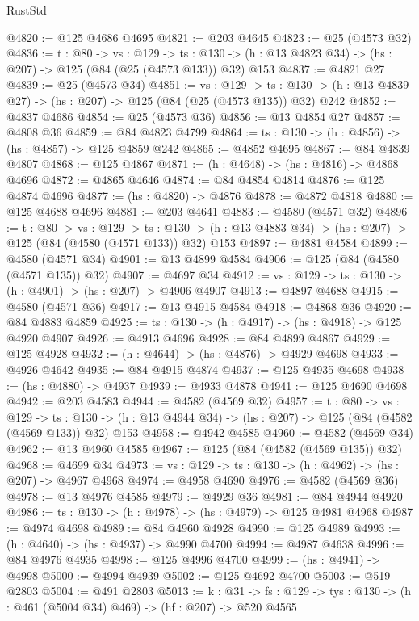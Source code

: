 \begin{lexlean}{RustStd}
\begin{coremodule}
@4820 := @125 @4686 @4695
@4821 := @203 @4645
@4823 := @25 (@4573 @32)
@4836 := {t : @80} ->
  {vs : @129} ->
  {ts : @130} -> (h : @13 @4823 @34) -> (hs : @207) -> @125 (@84 (@25 (@4573 @133)) @32) @153
@4837 := @4821 @27
@4839 := @25 (@4573 @34)
@4851 := {vs : @129} ->
  {ts : @130} -> (h : @13 @4839 @27) -> (hs : @207) -> @125 (@84 (@25 (@4573 @135)) @32) @242
@4852 := @4837 @4686
@4854 := @25 (@4573 @36)
@4856 := @13 @4854 @27
@4857 := @4808 @36
@4859 := @84 @4823 @4799
@4864 := {ts : @130} -> (h : @4856) -> (hs : @4857) -> @125 @4859 @242
@4865 := @4852 @4695
@4867 := @84 @4839 @4807
@4868 := @125 @4867
@4871 := (h : @4648) -> (hs : @4816) -> @4868 @4696
@4872 := @4865 @4646
@4874 := @84 @4854 @4814
@4876 := @125 @4874 @4696
@4877 := (hs : @4820) -> @4876
@4878 := @4872 @4818
@4880 := @125 @4688 @4696
@4881 := @203 @4641
@4883 := @4580 (@4571 @32)
@4896 := {t : @80} ->
  {vs : @129} ->
  {ts : @130} -> (h : @13 @4883 @34) -> (hs : @207) -> @125 (@84 (@4580 (@4571 @133)) @32) @153
@4897 := @4881 @4584
@4899 := @4580 (@4571 @34)
@4901 := @13 @4899 @4584
@4906 := @125 (@84 (@4580 (@4571 @135)) @32)
@4907 := @4697 @34
@4912 := {vs : @129} -> {ts : @130} -> (h : @4901) -> (hs : @207) -> @4906 @4907
@4913 := @4897 @4688
@4915 := @4580 (@4571 @36)
@4917 := @13 @4915 @4584
@4918 := @4868 @36
@4920 := @84 @4883 @4859
@4925 := {ts : @130} -> (h : @4917) -> (hs : @4918) -> @125 @4920 @4907
@4926 := @4913 @4696
@4928 := @84 @4899 @4867
@4929 := @125 @4928
@4932 := (h : @4644) -> (hs : @4876) -> @4929 @4698
@4933 := @4926 @4642
@4935 := @84 @4915 @4874
@4937 := @125 @4935 @4698
@4938 := (hs : @4880) -> @4937
@4939 := @4933 @4878
@4941 := @125 @4690 @4698
@4942 := @203 @4583
@4944 := @4582 (@4569 @32)
@4957 := {t : @80} ->
  {vs : @129} ->
  {ts : @130} -> (h : @13 @4944 @34) -> (hs : @207) -> @125 (@84 (@4582 (@4569 @133)) @32) @153
@4958 := @4942 @4585
@4960 := @4582 (@4569 @34)
@4962 := @13 @4960 @4585
@4967 := @125 (@84 (@4582 (@4569 @135)) @32)
@4968 := @4699 @34
@4973 := {vs : @129} -> {ts : @130} -> (h : @4962) -> (hs : @207) -> @4967 @4968
@4974 := @4958 @4690
@4976 := @4582 (@4569 @36)
@4978 := @13 @4976 @4585
@4979 := @4929 @36
@4981 := @84 @4944 @4920
@4986 := {ts : @130} -> (h : @4978) -> (hs : @4979) -> @125 @4981 @4968
@4987 := @4974 @4698
@4989 := @84 @4960 @4928
@4990 := @125 @4989
@4993 := (h : @4640) -> (hs : @4937) -> @4990 @4700
@4994 := @4987 @4638
@4996 := @84 @4976 @4935
@4998 := @125 @4996 @4700
@4999 := (hs : @4941) -> @4998
@5000 := @4994 @4939
@5002 := @125 @4692 @4700
@5003 := @519 @2803
@5004 := @491 @2803
@5013 := {k : @31} ->
  {fs : @129} -> {tys : @130} -> (h : @461 (@5004 @34) @469) -> (hf : @207) -> @520 @4565

\end{coremodule}
\end{lexlean}

